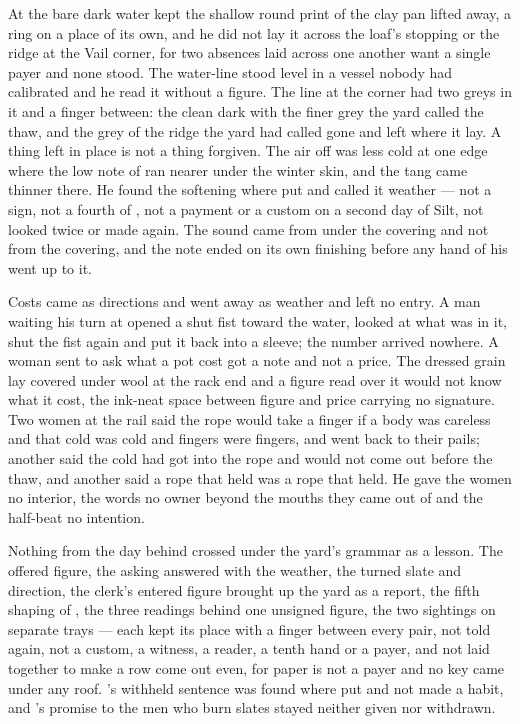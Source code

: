 At  the bare dark water kept the shallow round print of the clay pan lifted away, a ring on a place of its own, and he did not lay it across the loaf's stopping or the ridge at the Vail corner, for two absences laid across one another want a single payer and none stood. The water-line stood level in a vessel nobody had calibrated and he read it without a figure. The line at the corner had two greys in it and a finger between: the clean dark with the finer grey the yard called the thaw, and the grey of the ridge the yard had called gone and left where it lay. A thing left in place is not a thing forgiven. The air off  was less cold at one edge where the low note of  ran nearer under the winter skin, and the tang came thinner there. He found the softening where put and called it weather --- not a sign, not a fourth of , not a payment or a custom on a second day of Silt, not looked twice or made again. The sound came from under the covering and not from the covering, and the note ended on its own finishing before any hand of his went up to it.

Costs came as directions and went away as weather and left no entry. A man waiting his turn at  opened a shut fist toward the water, looked at what was in it, shut the fist again and put it back into a sleeve; the number arrived nowhere. A woman sent to ask what a pot cost got a note and not a price. The dressed grain lay covered under wool at the rack end and a figure read over it would not know what it cost, the ink-neat space between figure and price carrying no signature. Two women at the rail said the rope would take a finger if a body was careless and that cold was cold and fingers were fingers, and went back to their pails; another said the cold had got into the rope and would not come out before the thaw, and another said a rope that held was a rope that held. He gave the women no interior, the words no owner beyond the mouths they came out of and the half-beat no intention.

Nothing from the day behind crossed under the yard's grammar as a lesson. The offered figure, the asking answered with the weather, the turned slate and direction, the clerk's entered figure brought up the yard as a report, the fifth shaping of , the three readings behind one unsigned figure, the two sightings on separate trays --- each kept its place with a finger between every pair, not told again, not a custom, a witness, a reader, a tenth hand or a payer, and not laid together to make a row come out even, for paper is not a payer and no key came under any roof. 's withheld sentence was found where put and not made a habit, and 's promise to the men who burn slates stayed neither given nor withdrawn.

